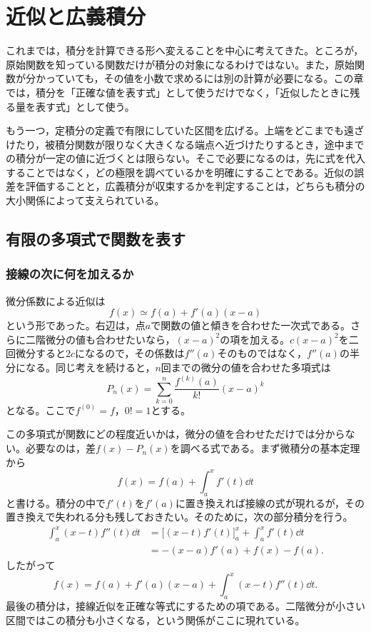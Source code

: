 \chapter{近似と広義積分}\label{章:近似と広義積分}

これまでは，積分を計算できる形へ変えることを中心に考えてきた。ところが，原始関数を知っている関数だけが積分の対象になるわけではない。また，原始関数が分かっていても，その値を小数で求めるには別の計算が必要になる。この章では，積分を「正確な値を表す式」として使うだけでなく，「近似したときに残る量を表す式」として使う。

もう一つ，定積分の定義で有限にしていた区間を広げる。上端をどこまでも遠ざけたり，被積分関数が限りなく大きくなる端点へ近づけたりするとき，途中までの積分が一定の値に近づくとは限らない。そこで必要になるのは，先に式を代入することではなく，どの極限を調べているかを明確にすることである。近似の誤差を評価することと，広義積分が収束するかを判定することは，どちらも積分の大小関係によって支えられている。

\section{有限の多項式で関数を表す}\label{節:有限テイラー}

\subsection{接線の次に何を加えるか}

微分係数による近似は
\[
 f(x)\simeq f(a)+f'(a)(x-a)
\]
という形であった。右辺は，点$a$で関数の値と傾きを合わせた一次式である。さらに二階微分の値も合わせたいなら，$(x-a)^2$の項を加える。$c(x-a)^2$を二回微分すると$2c$になるので，その係数は$f''(a)$そのものではなく，$f''(a)$の半分になる。同じ考えを続けると，$n$回までの微分の値を合わせた多項式は
\[
 P_n(x)=\sum_{k=0}^{n}\frac{f^{(k)}(a)}{k!}(x-a)^k
\]
となる。ここで$f^{(0)}=f$，$0!=1$とする。

この多項式が関数にどの程度近いかは，微分の値を合わせただけでは分からない。必要なのは，差$f(x)-P_n(x)$を調べる式である。まず微積分の基本定理から
\[
 f(x)=f(a)+\int_a^x f'(t)\dd t
\]
と書ける。積分の中で$f'(t)$を$f'(a)$に置き換えれば接線の式が現れるが，その置き換えで失われる分も残しておきたい。そのために，次の部分積分を行う。
\[
\begin{aligned}
 \int_a^x (x-t)f''(t)\dd t
 &=\bigl[(x-t)f'(t)\bigr]_a^x
   +\int_a^x f'(t)\dd t\\
 &=-(x-a)f'(a)+f(x)-f(a).
\end{aligned}
\]
したがって
\[
 f(x)=f(a)+f'(a)(x-a)
      +\int_a^x(x-t)f''(t)\dd t.
\]
最後の積分は，接線近似を正確な等式にするための項である。二階微分が小さい区間ではこの積分も小さくなる，という関係がここに現れている。

